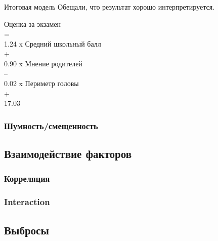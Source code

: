 \documentclass[14pt, fleqn, xcolor={dvipsnames, table}, hyperref={unicode}, babel={english,russian}, inputenc=utf8x]{beamer}
\begin{document}
\begin{frame}{Итоговая модель}
Обещали, что результат хорошо интерпретируется. \\
\begin{center}
Оценка за экзамен\\ = \\
1.24 x Средний школьный балл \\
 + \\
0.90 x Мнение родителей \\
 – \\
0.02 x Периметр головы \\
  + \\
17.03
\end{center}
\end{frame}


\subsubsection{Шумность/смещенность}
\subsection{Взаимодействие факторов}
\subsubsection{Корреляция}
\subsubsection{Interaction}
\subsection{Выбросы}
\end{document}
